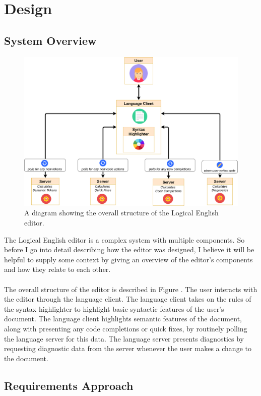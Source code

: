\documentclass[../main.tex]{subfiles}
\begin{document}
\chapter{Design}
\section{System Overview}
\begin{figure}[h!]
\centering
\includegraphics[width = \linewidth]{./figures/le-editor.png}
\caption{A diagram showing the overall structure of the Logical English editor.}
\label{fig:system-overview}
\end{figure}
The Logical English editor is a complex system with multiple components. So before I go into detail describing how the editor was designed, I believe it will be helpful to supply some context by giving an overview of the editor's components and how they relate to each other.
\\
\\
The overall structure of the editor is described in Figure \cite{fig:system-overview}. The user interacts with the editor through the language client. The language client takes on the rules of the syntax highlighter to highlight basic syntactic features of the user's document. The language client highlights semantic features of the document, along with presenting any code completions or quick fixes, by routinely polling the language server for this data. The language server presents diagnostics by requesting diagnostic data from the server whenever the user makes a change to the document.

\section{Requirements Approach}
\end{document}
